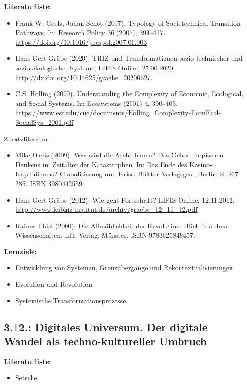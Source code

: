 \documentclass[11pt,a4paper]{article}
\begin{document}
\textbf{Literaturliste:}
\begin{itemize}[noitemsep]
\item Frank W. Geels, Johan Schot (2007). Typology of Sociotechnical
  Transition Pathways. In: Research Policy 36 (2007), 399–417.\\
  \url{https://doi.org/10.1016/j.respol.2007.01.003} 
\item Hans-Gert Gräbe (2020). TRIZ und Transformationen sozio-technischer und
  sozio-ökolo\-gischer Systeme. LIFIS Online, 27.06.2020.
  \url{http://dx.doi.org/10.14625/graebe_20200627}.
\item C.S. Holling (2000). Understanding the Complexity of Economic,
  Ecological, and Social Systems. In: Ecosystems (2001) 4, 390–405.
  \url{https://www.esf.edu/cue/documents/Holling_Complexity-EconEcol-SocialSys_2001.pdf}
\end{itemize}

Zusatzliteratur:
\begin{itemize}[noitemsep]
\item Mike Davis (2009).  Wer wird die Arche bauen? Das Gebot utopischen
  Denkens im Zeitalter der Katastrophen.  In: Das Ende des
  Kasino-Kapitalismus?  Globalisierung und Krise. Blätter
  Verlagsges., Berlin, S. 267-285. ISBN 3980492559. 
\item Hans-Gert Gräbe (2012). Wie geht Fortschritt? LIFIS Online, 12.11.2012.
  \url{http://www.leibniz-institut.de/archiv/graebe_12_11_12.pdf}
\item Rainer Thiel (2000). Die Allmählichkeit der Revolution. Blick in sieben
  Wissenschaften.  LIT-Verlag, Münster. ISBN 9783825849457. 
\end{itemize}

\textbf{Lernziele:}
\begin{itemize}[noitemsep]
\item Entwicklung von Systemen, Grenzübergänge und Rekontextualisierungen 
\item Evolution und Revolution
\item Systemische Transformationsprozesse
\end{itemize}

\subsection{3.12.: Digitales Universum. Der digitale Wandel als
  techno-kultureller Umbruch}

\textbf{Literaturliste:}
\begin{itemize}[noitemsep]
\item Setsche
\end{itemize}
\end{document}
